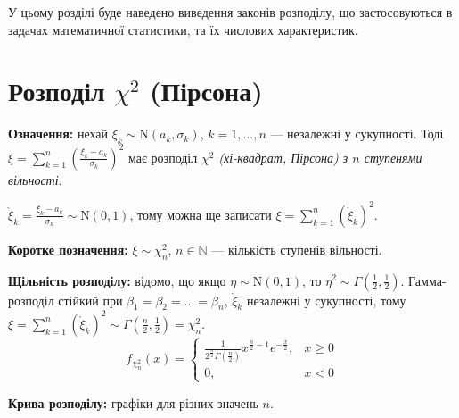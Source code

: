 
У цьому розділі буде наведено виведення законів розподілу, що застосовуються
в задачах математичної статистики, та їх числових характеристик.

\section{Розподіл \texorpdfstring{$\chi^2$}{x2} (Пірсона)}
\noindent\textbf{Означення:}
    нехай $\xi_k \sim \mathrm{N}(a_k, \sigma_k)$, $k= 1,..., n$ --- незалежні у сукупності.
    Тоді $\xi = \sum\limits_{k=1}^n \left( \frac{\xi_k - a_k}{\sigma_k}\right)^2$ має
    розподіл \emph{$\chi^2$ (хі-квадрат, Пірсона) з $n$ ступенями вільності}.

    \noindent$\mathring{\xi}_{k} = \frac{\xi_k - a_k}{\sigma_k} \sim \mathrm{N}(0, 1)$, тому можна ще записати
    $\xi = \sum\limits_{k=1}^n (\mathring{\xi}_{k})^2$.

\noindent\textbf{Коротке позначення:} $\xi \sim \chi_n^2$, $n\in\mathbb{N}$ --- кількість ступенів вільності.

\noindent\textbf{Щільність розподілу:}
відомо, що якщо $\eta \sim \mathrm{N}(0, 1)$, то $\eta^2 \sim \Gamma\left(\frac{1}{2}, \frac{1}{2}\right)$.
Гамма-розподіл стійкий при $\beta_1 = \beta_2 = ... = \beta_n$, $\mathring{\xi}_{k}$ незалежні у сукупності,
тому $\xi = \sum\limits_{k=1}^n (\mathring{\xi}_{k})^2 \sim \Gamma\left(\frac{n}{2}, \frac{1}{2}\right) = \chi_n^2$.
\begin{equation*}
    f_{\chi_n^2}(x) = \begin{cases}
        \frac{1}{2^{\frac{n}{2}} \Gamma\left(\frac{n}{2}\right)} x^{\frac{n}{2}-1} e^{-\frac{x}{2}}, & x \geq 0 \\
        0, & x < 0
    \end{cases}
\end{equation*}

\noindent \textbf{Крива розподілу:} графіки для різних значень $n$.
\begin{center}
\end{center}


